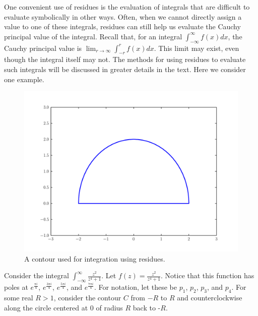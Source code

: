 One convenient use of residues is the evaluation of integrals that are difficult to evaluate symbolically in other ways.
Often, when we cannot directly assign a value to one of these integrals, residues can still help us evaluate the Cauchy principal value of the integral.
Recall that, for an integral $\int_{-\infty}^{\infty} f(x)dx$, the Cauchy principal value is $\lim_{r\to \infty} \int_{-r}^{r} f(x) dx$.
This limit may exist, even though the integral itself may not.
The methods for using residues to evaluate such integrals will be discussed in greater details in the text.
Here we consider one example.

\begin{figure}
\includegraphics[width=\textwidth]{contour1.pdf}
\caption{A contour used for integration using residues.}
\label{complexint:c1}
\end{figure}

Consider the integral $\int_{-\infty}^{\infty}\frac{z^2}{z^4+1}$.
Let $f(z)=\frac{z^2}{z^4+1}$.
Notice that this function has poles at $e^{\frac{\pi i}{4}}$, $e^{\frac{3\pi i}{4}}$, $e^{\frac{5\pi i}{4}}$, and $e^{\frac{7\pi i}{4}}$.
For notation, let these be $p_1$, $p_2$, $p_3$, and $p_4$.
For some real $R>1$, consider the contour $C$ from $-R$ to $R$ and counterclockwise along the circle centered at $0$ of radius $R$ back to -$R$.

